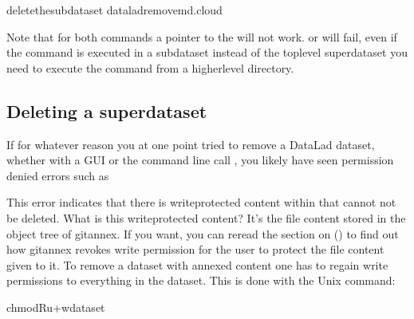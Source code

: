 \begin{sphinxVerbatim}[commandchars=\\\{\}]
deletethesubdataset
dataladremove\PYGZhy{}m\PYGZhy{}d.cloud
\end{sphinxVerbatim}

\sphinxAtStartPar
Note that for both commands a pointer to the  will not work.
 or  will fail, even if
the command is executed in a subdataset instead of the top\sphinxhyphen{}level
superdataset \textendash{} you need to execute the command from a higher\sphinxhyphen{}level directory.


\subsection{Deleting a superdataset}
\label{\detokenize{basics/101-136-filesystem:deleting-a-superdataset}}
\sphinxAtStartPar
If for whatever reason you at one point tried to remove a DataLad dataset,
whether with a GUI or the command line call , you likely
have seen permission denied errors such as

\sphinxAtStartPar
This error indicates that there is write\sphinxhyphen{}protected content within  that
cannot not be deleted. What is this write\sphinxhyphen{}protected content? It’s the file content
stored in the object tree of git\sphinxhyphen{}annex. If you want, you can re\sphinxhyphen{}read the section on
{\hyperref[\detokenize{basics/101-115-symlinks:symlink}]{}} () to find out how git\sphinxhyphen{}annex revokes write permission for the user
to protect the file content given to it. To remove a dataset with annexed content
one has to regain write permissions to everything in the dataset. This is done
with the Unix  command:

\begin{sphinxVerbatim}[commandchars=\\\{\}]
chmod\PYGZhy{}Ru+w\PYGZlt{}dataset\PYGZgt{}
\end{sphinxVerbatim}

